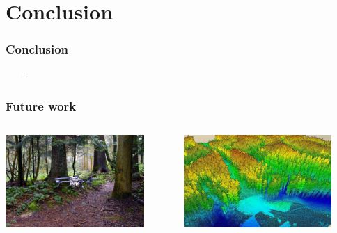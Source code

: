 \section{Conclusion}

\begin{frame}
	\frametitle{Conclusion}
	\begin{itemize}
		\item[-] 
	\end{itemize}
\end{frame}

\begin{frame}
	\frametitle{Future work}
	\begin{columns}
	\begin{column}{0.5\textwidth}\centering
		\begin{center}
			\includegraphics[height=3.5cm]{figures/forest-uav}
			\label{fig:forest_uav}
		\end{center}
	\end{column}
	\begin{column}{0.5\textwidth}\centering
		\begin{center}
			\includegraphics[height=3.5cm]{figures/forest-pc}
			\label{fig:forest_plc}
		\end{center}
	\end{column}
\end{columns}
\end{frame}
